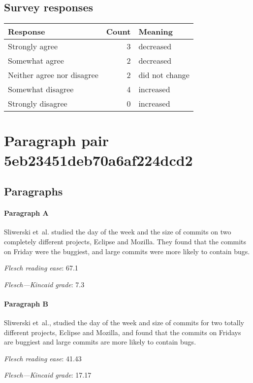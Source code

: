 \subsection{Survey responses}
\begin{tabular}{lrl}
\toprule
          \textbf{Response} &  \textbf{Count} & \textbf{Meaning} \\
\midrule
             Strongly agree &               3 &        decreased \\
             Somewhat agree &               2 &        decreased \\
 Neither agree nor disagree &               2 &   did not change \\
          Somewhat disagree &               4 &        increased \\
          Strongly disagree &               0 &        increased \\
\bottomrule
\end{tabular}

\section{Paragraph pair 5eb23451deb70a6af224dcd2}
\subsection{Paragraphs}
\paragraph{Paragraph A}
Sliwerski et al. studied the day of the week and the size of commits on two completely different projects, Eclipse and Mozilla. They found that the commits on Friday were the buggiest, and large commits were more likely to contain bugs.\par\medskip
\emph{Flesch reading ease}: 67.1\par
\emph{Flesch---Kincaid grade}: 7.3

\paragraph{Paragraph B}
Sliwerski et al., studied the day of the week and size of commits for two totally different projects, Eclipse and Mozilla, and found that the commits on Fridays are buggiest and large commits are more likely to contain bugs.\par\medskip
\emph{Flesch reading ease}: 41.43\par
\emph{Flesch---Kincaid grade}: 17.17


